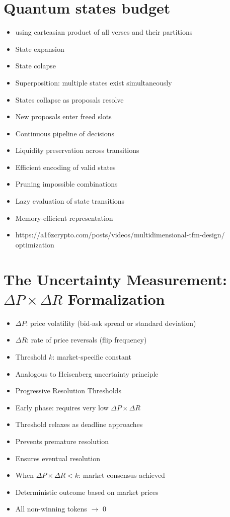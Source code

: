 \documentclass{article}
\begin{document}
\section{Quantum states budget}
\begin{itemize}
    \item using carteasian product of all verses and their partitions
    \item State expansion
    \item State colapse
    \item Superposition: multiple states exist simultaneously
    \item States collapse as proposals resolve
    \item New proposals enter freed slots
    \item Continuous pipeline of decisions
    \item Liquidity preservation across transitions
    \item Efficient encoding of valid states
    \item Pruning impossible combinations
    \item Lazy evaluation of state transitions
    \item Memory-efficient representation
    \item https://a16zcrypto.com/posts/videos/multidimensional-tfm-design/ optimization
\end{itemize}

\section{The Uncertainty Measurement: $\Delta P \times \Delta R$ Formalization}
\begin{itemize}
   \item $\Delta P$: price volatility (bid-ask spread or standard deviation)
   \item $\Delta R$: rate of price reversals (flip frequency)
   \item Threshold $k$: market-specific constant
   \item Analogous to Heisenberg uncertainty principle
   \item Progressive Resolution Thresholds
    \item Early phase: requires very low $\Delta P \times \Delta R$
    \item Threshold relaxes as deadline approaches
    \item Prevents premature resolution
    \item Ensures eventual resolution
   \item When $\Delta P \times \Delta R < k$: market consensus achieved
   \item Deterministic outcome based on market prices
   \item All non-winning tokens $\rightarrow$ 0
\end{itemize}
\end{document}
